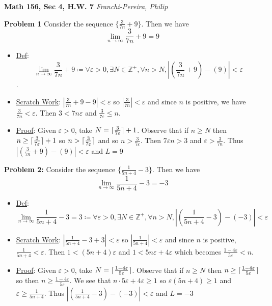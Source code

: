 \documentclass[11pt, oneside]{article}
\newcommand{\Integers}{\mathbb{Z}}
\DeclarePairedDelimiter{\ceil}{\lceil}{\rceil}
\begin{document}
{\Large\textbf{Math 156, Sec 4, H.W. 7}} \textit{Franchi-Pereira, Philip}
\vspace{2em}

\textbf{Problem 1} Consider the sequence \(\{\frac{3}{7n} + 9\}\). Then we have  \[\lim_{n\to \infty}{\frac{3}{7n} + 9} = 9\]
\begin{itemize}
    \item[]\underline{Def}: \[\lim_{n\to \infty}{\frac{3}{7n} + 9} \coloneq \forall \varepsilon > 0, \exists N \in \Integers^+, \forall n > N, |(\frac{3}{7n} + 9) - (9) | < \varepsilon\].
    \item[]\underline{Scratch Work}: \(|\frac{3}{7n} + 9 - 9| < \varepsilon\) so \(|\frac{3}{7n}| < \varepsilon\) and since \(n\) is positive, we have \(\frac{3}{7n} < \varepsilon\). Then \(3 < 7n\varepsilon\) and \(\frac{3}{7\varepsilon} \leq n\).
    \item[]\underline{Proof}: Given \(\varepsilon > 0\), take \(N = \ceil{\frac{3}{7\varepsilon}} + 1\). Observe that if \(n \geq N\) then \(n \geq \ceil{\frac{3}{7\varepsilon}} + 1\) so \(n > \ceil{\frac{3}{7\varepsilon}}\) and so \(n > \frac{3}{7\varepsilon}\). Then \(7\varepsilon n > 3\) and \(\varepsilon > \frac{3}{7n}\). Thus \(|(\frac{3}{7n} + 9) - (9)| < \varepsilon\) and \(L = 9\)
\end{itemize}
\vspace{2em}
\textbf{Problem 2:} Consider the sequence \(\{\frac{1}{5n+4} - 3\}\). Then we have \[\lim_{n\to \infty}{\frac{1}{5n+4} - 3} = -3\]

\begin{itemize}
    \item[]\underline{Def}: \[\lim_{n\to \infty}{\frac{1}{5n+4} - 3 = 3} \coloneq \forall \varepsilon > 0, \exists N \in \Integers^+, \forall n > N, |(\frac{1}{5n+4} - 3) - (-3) | < \varepsilon\]
    \item[]\underline{Scratch Work}: \(|\frac{1}{5n+4} - 3 + 3| < \varepsilon\) so \(|\frac{1}{5n+4}| < \varepsilon\) and since \(n\) is positive, \(\frac{1}{5n+4}  < \varepsilon\). Then \(1 < (5n+4)\varepsilon\) and \(1 < 5n\varepsilon + 4 \varepsilon\) which becomes \(\frac{1-4\varepsilon}{5\varepsilon} < n\).
    \item[]\underline{Proof}: Given \(\varepsilon > 0\), take \(N = \ceil{\frac{1-4\varepsilon}{5\varepsilon}}\).
          Observe that if \(n \geq N\)
          then \(n \geq \ceil{\frac{1-4\varepsilon}{5\varepsilon}}\)
          so then \(n \geq \frac{1-4\varepsilon}{5\varepsilon}\).
          We see that \(n\cdot 5\varepsilon + 4\varepsilon \geq 1\)
          so \(\varepsilon(5n +4) \geq 1\) and \(\varepsilon \geq \frac{1}{5n+4}\). Thus \(|(\frac{1}{5n+4} - 3) - (-3)| < \varepsilon\) and \(L = -3\)

\end{itemize}
\vspace{2em}
\end{document}
